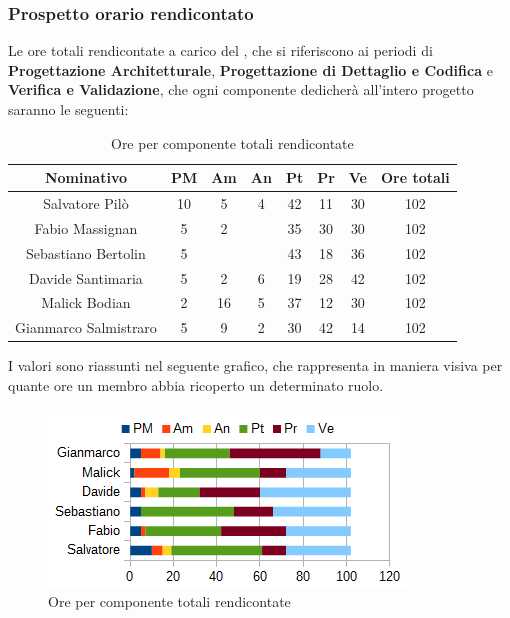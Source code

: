 		\subsubsection{Prospetto orario rendicontato}
		Le ore totali rendicontate a carico del , che si riferiscono ai periodi di \textbf{Progettazione Architetturale}, \textbf{Progettazione di Dettaglio e Codifica} e \textbf{Verifica e Validazione}, che ogni componente dedicherà all'intero progetto saranno le seguenti: \\
		\begin{table}[H]
		\centering
		\begin{tabular}{|c|c|c|c|c|c|c|c|}
			\hline
			\textbf{Nominativo}		& \textbf{PM}	& \textbf{Am}	& \textbf{An}	& \textbf{Pt}	& \textbf{Pr}	& \textbf{Ve}	& \textbf{Ore totali}     \\
			\hline
			Salvatore Pilò			& 10	& 5		& 4		& 42	& 11	& 30	& 102 \\
			Fabio Massignan			& 5		& 2		& 		& 35	& 30	& 30	& 102 \\
			Sebastiano Bertolin		& 5		& 		& 		& 43	& 18	& 36	& 102 \\
			Davide Santimaria		& 5		& 2		& 6		& 19	& 28	& 42	& 102 \\
			Malick Bodian			& 2		& 16	& 5		& 37	& 12	& 30	& 102 \\
			Gianmarco Salmistraro	& 5		& 9		& 2		& 30	& 42	& 14	& 102 \\
			\hline
		\end{tabular}
		\caption{Ore per componente totali rendicontate}
		\end{table}
		I valori sono riassunti nel seguente grafico, che rappresenta in maniera visiva per quante ore un membro abbia ricoperto un determinato ruolo. \\
		\begin{figure}[H]
			\centering
			\includegraphics[scale=1]{immagini/grafici/orario_rendicontato-barra.png}
			\caption{Ore per componente totali rendicontate}
		\end{figure}
